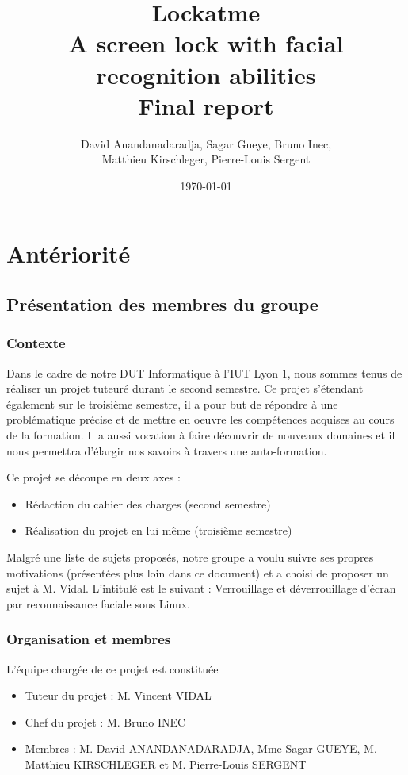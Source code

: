 \documentclass[french]{report}
\title{Lockatme\\A screen lock with facial recognition abilities\\Final report}
\date{\today}
\author{David Anandanadaradja, Sagar Gueye, Bruno Inec,\\ Matthieu Kirschleger,
Pierre-Louis Sergent}
\begin{document}
    \maketitle

    \tableofcontents

\chapter{Antériorité}
\newpage

\section{Présentation des membres du groupe}

\subsection{Contexte}
Dans le cadre de notre DUT Informatique à l’IUT Lyon 1, nous sommes tenus de
réaliser un projet tuteuré durant le second semestre. Ce projet s’étendant
également sur le troisième semestre, il a pour but de répondre à une
problématique précise et de mettre en oeuvre les compétences acquises au cours
de la formation. Il a aussi vocation à faire découvrir de nouveaux domaines et
il nous permettra d’élargir nos savoirs à travers une auto-formation.

\vspace{0.5cm}
Ce projet se découpe en deux axes :
\begin{itemize}[label=\textbullet, font=\normalfont \color{blue}]
  \item{Rédaction du cahier des charges (second semestre)}
  \item{Réalisation du projet en lui même (troisième semestre)}
\end{itemize}
\vspace{0.5cm}

Malgré une liste de sujets proposés, notre groupe a voulu suivre ses propres
motivations (présentées plus loin dans ce document) et a choisi de proposer un
sujet à M. Vidal. L’intitulé est le suivant : Verrouillage et déverrouillage
d’écran par reconnaissance faciale sous Linux.

\subsection{Organisation et membres}
L’équipe chargée de ce projet est constituée
\begin{itemize}[label=\textbullet, font=\normalfont \color{blue}]
  \item{Tuteur du projet : M. Vincent VIDAL}
  \item{Chef du projet : M. Bruno INEC}
  \item{Membres : M. David ANANDANADARADJA, Mme Sagar GUEYE, M. Matthieu
        KIRSCHLEGER et M. Pierre-Louis SERGENT}
\end{itemize}
\end{document}
